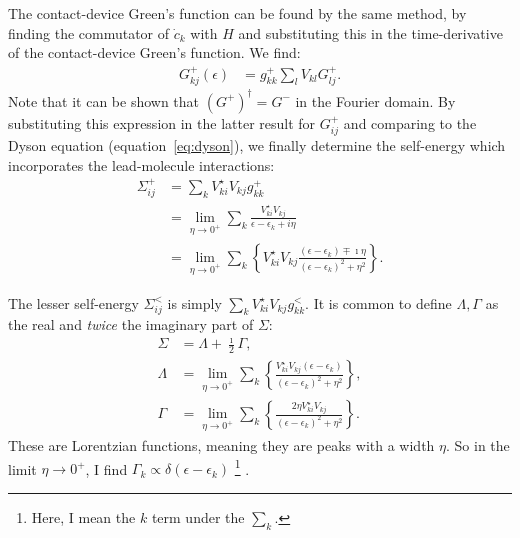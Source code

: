 The contact-device Green's function can be found by the same method, by finding the commutator of $\dot{c}_{k}$ with $H$ and substituting this in the time-derivative of the contact-device Green's function. We find:
\begin{align}
G_{kj}^+ (\epsilon) &= g_{kk}^+ \sum_l V_{kl} G_{lj}^+.
\label{eq:contactdevice}
\end{align} Note that it can be shown that $(G^+)^\dagger=G^-$ in the Fourier domain.
By substituting this expression in the latter result for $G_{ij}^+$ and comparing to the Dyson equation (equation~\ref{eq:dyson}), we finally determine the self-energy which incorporates the lead-molecule interactions:
\begin{align*}
\Sigma_{ij}^+ &= \sum_{k} V_{ki}^\star V_{kj} g_{kk}^+ \\
&= \lim_{\eta\rightarrow 0^+} \sum_{k}\frac{ V_{ki}^\star V_{kj}}{\epsilon-\epsilon_{k} + i\eta} \\
&= \lim_{\eta\rightarrow 0^+}\sum_{k} \left\{V_{ki}^\star V_{kj} \frac{ \left(\epsilon-\epsilon_{k}\right) \mp \imath \eta}{  \left(\epsilon-\epsilon_{k}\right)^2 + \eta^2}\right\}.
\end{align*} 

The lesser self-energy $\Sigma^<_{ij}$ is simply $\sum_{k} V_{ki}^\star V_{kj} g_{kk}^<$. It is common to define  $\Lambda, \Gamma$ as the real and \emph{twice} the imaginary part of $\Sigma$:
\begin{align*}
\Sigma &= \Lambda + \frac{\imath}{2} \Gamma ,\\
\Lambda &=  \lim_{\eta\rightarrow 0^+}\sum_{k} \left\{ \frac{V_{ki}^\star V_{kj} \left(\epsilon-\epsilon_{k}\right)}{  \left(\epsilon-\epsilon_{k}\right)^2 + \eta^2}\right\} ,\\
\Gamma &= 
\lim_{\eta\rightarrow 0^+}\sum_{k} \left\{ \frac{2 \eta V_{ki}^\star V_{kj}}{  \left(\epsilon-\epsilon_{k}\right)^2 + \eta^2}\right\}.
\end{align*}
These are Lorentzian functions, meaning they are peaks with a width $\eta$. So in the limit $\eta\rightarrow 0^+$, I find $\Gamma_{k} \propto \delta(\epsilon-\epsilon_{k})$ \footnote{Here, I mean the $k$ term under the $\sum_{k}$.} . 

